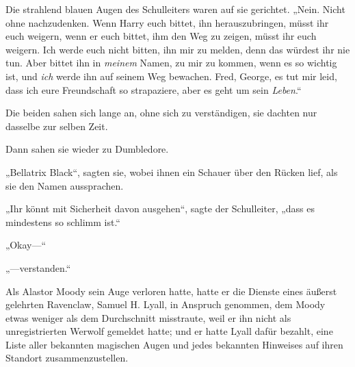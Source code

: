 Die strahlend blauen Augen des Schulleiters waren auf sie gerichtet. „Nein. Nicht ohne nachzudenken. Wenn Harry euch bittet, ihn herauszubringen, müsst ihr euch weigern, wenn er euch bittet, ihm den Weg zu zeigen, müsst ihr euch weigern. Ich werde euch nicht bitten, ihn mir zu melden, denn das würdest ihr nie tun. Aber bittet ihn in \emph{meinem} Namen, zu mir zu kommen, wenn es so wichtig ist, und \emph{ich} werde ihn auf seinem Weg bewachen. Fred, George, es tut mir leid, dass ich eure Freundschaft so strapaziere, aber es geht um sein \emph{Leben}.“

Die beiden sahen sich lange an, ohne sich zu verständigen, sie dachten nur dasselbe zur selben Zeit.

Dann sahen sie wieder zu Dumbledore.

„Bellatrix Black“, sagten sie, wobei ihnen ein Schauer über den Rücken lief, als sie den Namen aussprachen.

„Ihr könnt mit Sicherheit davon ausgehen“, sagte der Schulleiter, „dass es mindestens so schlimm ist.“

„Okay—“

„—verstanden.“


Als Alastor Moody sein Auge verloren hatte, hatte er die Dienste eines äußerst gelehrten Ravenclaw, Samuel H. Lyall, in Anspruch genommen, dem Moody etwas weniger als dem Durchschnitt misstraute, weil er ihn nicht als unregistrierten Werwolf gemeldet hatte; und er hatte Lyall dafür bezahlt, eine Liste aller bekannten magischen Augen und jedes bekannten Hinweises auf ihren Standort zusammenzustellen.

